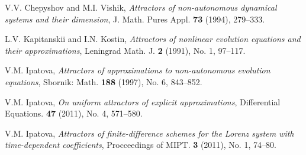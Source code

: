 \documentclass[10pt,a4paper]{article}
\begin{document}
\begin{thebibliography}{6}

V.V. Chepyshov and M.I. Vishik, \emph{Attractors of non-autonomous dynamical systems and their dimension}, J. Math. Pures Appl.   \textbf{73} (1994), 279--333.

L.V. Kapitanskii and I.N. Kostin, \emph{Attractors of nonlinear evolution equations and their approximations}, Leningrad Math. J. \textbf{2} (1991),  No. 1, 97--117.

V.M. Ipatova, \emph{Attractors of approximations to non-autonomous evolution equations},  Sbornik: Math.  \textbf{188} (1997),  No. 6,  843--852.

V.M. Ipatova,  \emph{On uniform attractors of explicit approximations}, Differential Equations. \textbf{47} (2011), No. 4, 571--580.

V.M. Ipatova,  \emph{Attractors of finite-difference schemes for the Lorenz system with time-dependent coefficients}, Procceedings of MIPT. \textbf{3} (2011), No. 1, 74--80.

\end{thebibliography}
\end{document}
